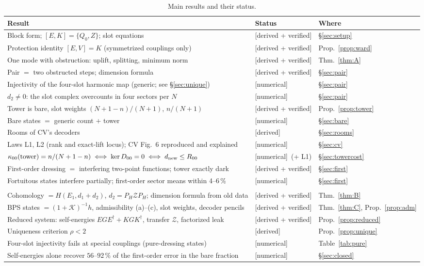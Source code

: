\documentclass[11pt]{article}
\newcommand{\PH}{P_{\!H}}
\newcommand{\dnew}{d_{\rm new}}
\newcommand{\Zc}{\mathcal Z}
\newcommand{\Kc}{\mathcal K}
\newcommand{\tagbox}[2]{\textsf{\small\color{#1}[#2]}}
\newcommand{\DER}{\tagbox{cder}{derived}}
\newcommand{\VER}{\tagbox{cder}{derived + verified}}
\newcommand{\NUM}{\tagbox{cnum}{numerical}}
\theoremstyle{plain}
\theoremstyle{remark}
\numberwithin{equation}{section}
\begin{document}
\begin{table}[ht]
\centering\small
\caption{Main results and their status.}\label{tab:status}
\begin{tabular}{@{}>{\raggedright\arraybackslash}p{}>{\raggedright\arraybackslash}p{}l@{}}\toprule
Result & Status & Where\\\midrule
Block form; $[E,K]=\{Q_0,Z\}$; slot equations & \VER & \S\ref{sec:setup}\\
Protection identity $[E,V]=K$ (symmetrized couplings only) & \VER & Prop.~\ref{prop:ward}\\
One mode with obstruction: uplift, splitting, minimum norm & \VER & Thm.~\ref{thm:A}\\
Pair $=$ two obstructed steps; dimension formula & \VER & \S\ref{sec:pair}\\
Injectivity of the four-slot harmonic map (generic; see \S\ref{sec:unique}) & \NUM & \S\ref{sec:pair}\\
$d_2\ne0$: the slot complex overcounts in four sectors per $N$ & \NUM & \S\ref{sec:pair}\\
Tower is bare, slot weights $(N+1-n)/(N+1)$, $n/(N+1)$ & \VER & Prop.~\ref{prop:tower}\\
Bare states $=$ generic count $+$ tower & \NUM & \S\ref{sec:bare}\\
Rooms of CV's decoders & \DER & \S\ref{sec:rooms}\\
Laws L1, L2 (rank and exact-lift locus); CV Fig.~6 reproduced and explained & \NUM & \S\ref{sec:cv}\\
$\kappa_{00}(\text{tower})=n/(N+1-n)\iff\ker D_{00}=0\iff \dnew\le R_{00}$ & \NUM\ (+ L1) & \S\ref{sec:towercost}\\
First-order dressing $=$ interfering two-point functions; tower exactly dark & \VER & \S\ref{sec:first}\\
Fortuitous states interfere partially; first-order sector means within 4--6\,\% & \NUM & \S\ref{sec:first}\\\midrule
\multicolumn{3}{@{}l}{\emph{Added 25 October: closed forms}}\\
Cohomology $=H(E_1,d_1+d_2)$, $d_2=\PH\Zc\PH$; dimension formula from old data & \VER & Thm.~\ref{thm:B}\\
BPS states $=(1+\Kc)^{-1}h$, admissibility (a)--(c), slot weights, decoder pencils & \VER & Thm.~\ref{thm:C}, Prop.~\ref{prop:adm}\\
Reduced system: self-energies $EGE^\dagger+KGK^\dagger$, transfer $\Zc$, factorized leak & \VER & Prop.~\ref{prop:reduced}\\
Uniqueness criterion $\rho<2$ & \DER & Prop.~\ref{prop:unique}\\
Four-slot injectivity fails at special couplings (pure-dressing states) & \NUM & Table~\ref{tab:pure}\\
Self-energies alone recover $56$--$92\,\%$ of the first-order error in the bare fraction & \NUM & \S\ref{sec:closed}\\\bottomrule
\end{tabular}
\end{table}
\end{document}
